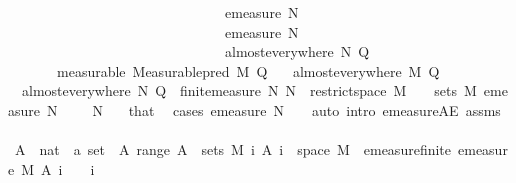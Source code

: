 \begin{isabellebody}
\ \ \ \ \ \ \ \ \ \ \ \ \ \ \ \ \ \ \ \ \ \ \ \ \ \ \ \ \ \ {\isasymLongrightarrow}\ emeasure\ N\ {\isasymOmega}\ {\isasymnoteq}\ {\isasyminfinity}\ \isanewline
\ \ \ \ \ \ \ \ \ \ \ \ \ \ \ \ \ \ \ \ \ \ \ \ \ \ \ \ \ \ {\isasymLongrightarrow}\ emeasure\ N\ {\isasymOmega}\ {\isasymnoteq}\ {}\ \isanewline
\ \ \ \ \ \ \ \ \ \ \ \ \ \ \ \ \ \ \ \ \ \ \ \ \ \ \ \ \ \ {\isasymLongrightarrow}\ almost{\isacharunderscore}{\kern0pt}everywhere\ N\ Q{\isachardoublequoteclose}\isanewline
\ \ \ \ \ \ \ {\isacharbrackleft}{\kern0pt}measurable{\isacharbrackright}{\kern0pt}{\isacharcolon}{\kern0pt}\ {\isachardoublequoteopen}Measurable{\isachardot}{\kern0pt}pred\ M\ Q{\isachardoublequoteclose}\isanewline
\ \ \ {\isachardoublequoteopen}almost{\isacharunderscore}{\kern0pt}everywhere\ M\ Q{\isachardoublequoteclose}\isanewline
%
\isadelimproof
%
\endisadelimproof
%
\isatagproof
{}\isamarkupfalse%
\ {\isacharminus}{\kern0pt}\isanewline
\ \ \isamarkupfalse%
\ {\isacharasterisk}{\kern0pt}{\isacharcolon}{\kern0pt}\ {\isachardoublequoteopen}almost{\isacharunderscore}{\kern0pt}everywhere\ N\ Q{\isachardoublequoteclose}\ \ {\isachardoublequoteopen}finite{\isacharunderscore}{\kern0pt}measure\ N{\isachardoublequoteclose}\ {\isachardoublequoteopen}N\ {\isacharequal}{\kern0pt}\ restrict{\isacharunderscore}{\kern0pt}space\ M\ {\isasymOmega}{\isachardoublequoteclose}\ {\isachardoublequoteopen}{\isasymOmega}\ {\isasymin}\ sets\ M{\isachardoublequoteclose}\ {\isachardoublequoteopen}emeasure\ N\ {\isasymOmega}\ {\isasymnoteq}\ {\isasyminfinity}{\isachardoublequoteclose}\ \ N\ {\isasymOmega}\ \isamarkupfalse%
\ that\ \isamarkupfalse%
\ {\isacharparenleft}{\kern0pt}cases\ {\isachardoublequoteopen}emeasure\ N\ {\isasymOmega}\ {\isacharequal}{\kern0pt}\ {}{\isachardoublequoteclose}{\isacharcomma}{\kern0pt}\ auto\ intro{\isacharcolon}{\kern0pt}\ emeasure{\isacharunderscore}{\kern0pt}{}{\isacharunderscore}{\kern0pt}AE\ assms{\isacharparenleft}{\kern0pt}{}{\isacharparenright}{\kern0pt}{\isacharparenright}{\kern0pt}\isanewline
\isanewline
\ \ \isamarkupfalse%
\ A\ {\isacharcolon}{\kern0pt}{\isacharcolon}{\kern0pt}\ {\isachardoublequoteopen}nat\ {\isasymRightarrow}\ {\isacharprime}{\kern0pt}a\ set{\isachardoublequoteclose}\ \ A{\isacharcolon}{\kern0pt}\ {\isachardoublequoteopen}range\ A\ {\isasymsubseteq}\ sets\ M{\isachardoublequoteclose}\ {\isachardoublequoteopen}{\isacharparenleft}{\kern0pt}{\isasymUnion}i{\isachardot}{\kern0pt}\ A\ i{\isacharparenright}{\kern0pt}\ {\isacharequal}{\kern0pt}\ space\ M{\isachardoublequoteclose}\ \ emeasure{\isacharunderscore}{\kern0pt}finite{\isacharcolon}{\kern0pt}\ {\isachardoublequoteopen}emeasure\ M\ {\isacharparenleft}{\kern0pt}A\ i{\isacharparenright}{\kern0pt}\ {\isasymnoteq}\ {\isasyminfinity}{\isachardoublequoteclose}\ \ i\ \isamarkupfalse%

\end{isabellebody}

